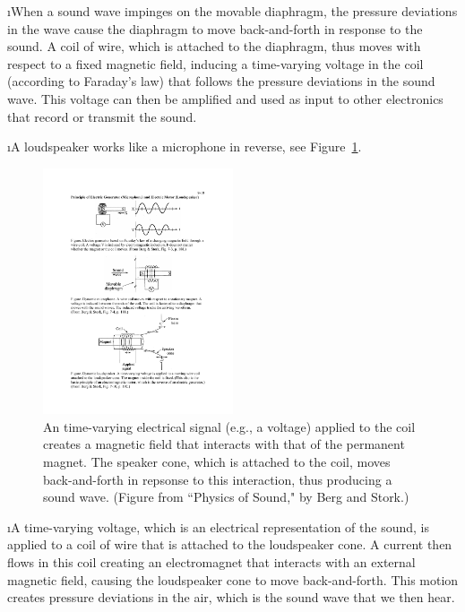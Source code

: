 \i When a sound wave impinges on the movable diaphragm, 
the pressure deviations in the wave cause the diaphragm 
to move back-and-forth in response to the sound.
A coil of wire, which is attached to the diaphragm, thus 
moves with respect to a fixed magnetic field, inducing a
time-varying voltage in the coil (according to Faraday's
law) that follows the pressure deviations in the sound wave.
This voltage can then be amplified and used as input 
to other electronics that record or transmit the sound. 

\i A loudspeaker works like a microphone in reverse, see
Figure~\ref{f:loudspeaker}.
%
\begin{figure}[htbp]
\begin{center}
\includegraphics[width=0.5\textwidth]{loudspeaker}
\caption{An time-varying electrical signal (e.g., a voltage) 
applied to the coil creates a magnetic field that interacts 
with that of the permanent magnet.
The speaker cone, which is attached to the coil, 
moves back-and-forth in repsonse to this interaction,
thus producing a sound wave. 
(Figure from ``Physics of Sound," by Berg and Stork.)} 
\label{f:loudspeaker}
\end{center}
\end{figure}
%

\i A time-varying voltage, which is an electrical 
representation of the sound, is applied to a coil of wire 
that is attached to the loudspeaker cone.
A current then flows in this coil creating an electromagnet
that interacts with an external magnetic field, causing
the loudspeaker cone to move back-and-forth.
This motion creates pressure deviations in 
the air, which is the sound wave that we then hear.

